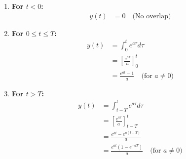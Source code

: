 \begin{enumerate}
    \item \textbf{For $t < 0$:}
    \begin{align}
        y(t) &= 0 \quad \text{(No overlap)}
    \end{align}
    
    \item \textbf{For $0 \leq t \leq T$:}
    \begin{align}
        y(t) &= \int_{0}^{t} e^{a\tau}d\tau \\
        &= \left[ \frac{e^{a\tau}}{a} \right]_{0}^{t} \\
        &= \frac{e^{at} - 1}{a} \quad \text{(for $a \neq 0$)}
    \end{align}
    
    \item \textbf{For $t > T$:}
    \begin{align}
        y(t) &= \int_{t-T}^{t} e^{a\tau}d\tau \\
        &= \left[ \frac{e^{a\tau}}{a} \right]_{t-T}^{t} \\
        &= \frac{e^{at} - e^{a(t-T)}}{a} \\
        &= \frac{e^{at}(1 - e^{-aT})}{a} \quad \text{(for $a \neq 0$)}
    \end{align}
\end{enumerate}

